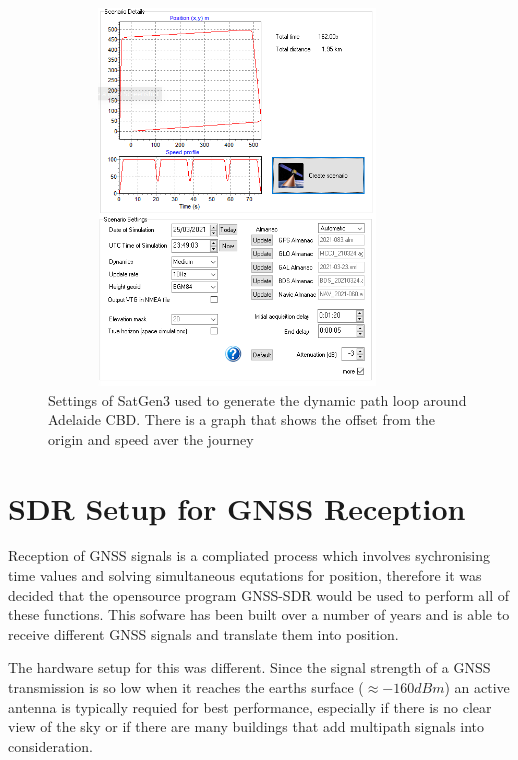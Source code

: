 \begin{figure}[h]
    \begin{centering}
        \includegraphics[width=10cm,height=10cm,keepaspectratio]{Figures/21-3-25_cbd_dynamic_setup.png}
        \caption{Settings of SatGen3 used to generate the dynamic path loop around Adelaide CBD. There is a graph that shows the offset from the origin and speed aver the journey}
    \label{fig:21MarCBDDynamic}
    \end{centering}
\end{figure}

\section{SDR Setup for GNSS Reception}
Reception of GNSS signals is a compliated process which involves sychronising time values and solving simultaneous equtations for position, therefore it was decided that
the opensource program GNSS-SDR would be used to perform all of these functions. This sofware has been built over a number of years and is able to receive different GNSS
signals and translate them into position.

The hardware setup for this was different. Since the signal strength of a GNSS transmission is so low when it reaches the earths surface ($\approx -160dBm$) an active
antenna is typically requied for best performance, especially if there is no clear view of the sky or if there are many buildings that add multipath signals into
consideration.
